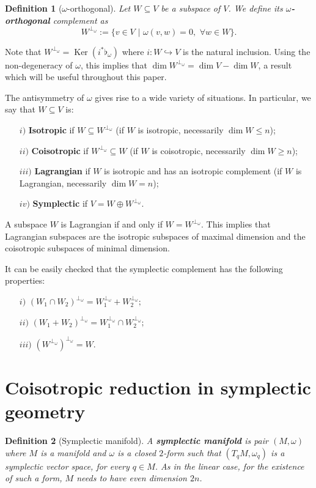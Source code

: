 \documentclass[12pt]{article}
\newtheorem{Def}{Definition}[section]
\renewcommand{\dim}{\operatorname{dim}}
\renewcommand{\ker}{\operatorname{Ker}}
\newcommand{\sectiontitle}{section}
\newcommand{\setsectiontitle}[1]{\renewcommand{\sectiontitle}{\footnotesize\textit{#1}}}
\begin{document}
\begin{Def}[$\omega$-orthogonal] Let $W \subseteq V$ be a subspace of $V$. We define its \textbf{$\omega$-orthogonal} complement as $$W^{\perp_\omega} := \{v \in V \,\,| \,\, \omega(v,w) = 0, \,\, \forall w \in W\}.$$
\end{Def}

Note that $W^{\perp_\omega} = \ker (i^* \flat_\omega)$ where $i :W \hookrightarrow V$ is the natural inclusion. Using the non-degeneracy of $\omega$, this implies that $\dim W^{\perp_\omega} = \dim V - \dim W$, a result which will be useful throughout this paper.

The antisymmetry of $\omega$ gives rise to a wide variety of situations. In particular, we say that $W \subseteq V$ is:
\begin{itemize}
\item[$i)$] \textbf{Isotropic} if $W \subseteq W^{\perp_\omega}$ (if $W$ is isotropic, necessarily $\dim W \leq n$);
\item[$ii)$] \textbf{Coisotropic} if $W^{\perp_\omega} \subseteq W$ (if $W$ is coisotropic, necessarily $\dim W \geq n$);
\item[$iii)$] \textbf{Lagrangian} if $W$ is isotropic and has an isotropic complement (if $W$ is Lagrangian, necessarily $\dim W  =  n$);
\item[$iv)$] \textbf{Symplectic} if $V = W \oplus W^{\perp_\omega}$.
\end{itemize}

A subspace $W$ is Lagrangian if and only if $W = W^{\perp_\omega}$. This implies that Lagrangian subspaces are the isotropic subspaces of maximal dimension and the coisotropic subspaces of minimal dimension.

It can be easily checked that the symplectic complement has the following properties:
\begin{itemize}
\item[$i)$] $(W_1 \cap W_2)^{\perp_\omega} = W_1^{\perp_\omega} + W_2^{\perp_\omega};$
\item[$ii)$] $(W_1 + W_2)^{\perp_\omega} = W_1^{\perp_\omega} \cap W_2^{\perp_\omega};$
\item[$iii)$] $(W^{\perp_\omega})^{\perp_\omega} = W.$

\end{itemize}


\section{Coisotropic reduction in symplectic geometry}\label{Symplectic}
\setsectiontitle{COISOTROPIC REDUCTION IN SYMPLECTIC GEOMETRY}
\begin{Def}[Symplectic manifold]
 A \textbf{symplectic manifold} is pair $(M , \omega)$ where $M$ is a manifold and $\omega$ is
a closed $2$-form such that $(T_qM, \omega_q)$ is a symplectic vector space, for every $q \in M$. As in the linear case, for the existence of such a form, $M$ needs to have even dimension $2n$. 
\end{Def}
\end{document}
